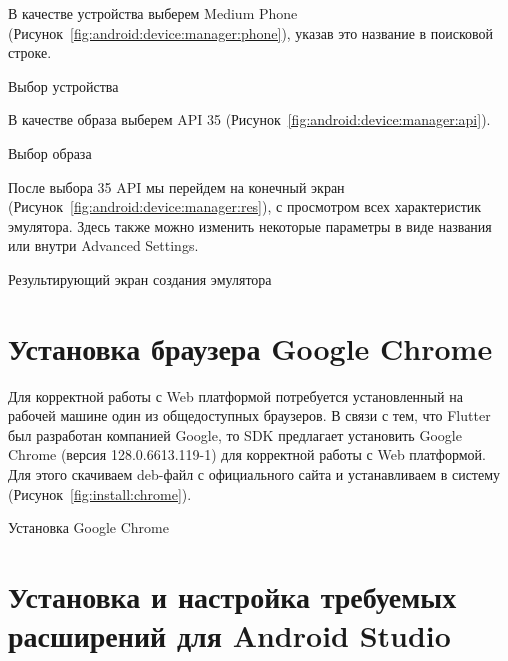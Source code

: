 В качестве устройства выберем Medium Phone
(Рисунок~\ref{fig:android:device:manager:phone}),
указав это название в поисковой строке.

\begin{image}
	\caption{Выбор устройства}
	\label{fig:android:device:manager:phone}
\end{image}

В качестве образа выберем API 35
(Рисунок~\ref{fig:android:device:manager:api}).

\begin{image}
	\caption{Выбор образа}
	\label{fig:android:device:manager:api}
\end{image}

После выбора 35 API мы перейдем на конечный экран
(Рисунок~\ref{fig:android:device:manager:res}),
с просмотром всех характеристик эмулятора.
Здесь также можно изменить некоторые параметры в виде названия
или внутри Advanced Settings.

\begin{image}
	\caption{Результирующий экран создания эмулятора}
	\label{fig:android:device:manager:res}
\end{image}

\section{Установка браузера Google Chrome}

Для корректной работы с Web платформой потребуется установленный
на рабочей машине один из общедоступных браузеров.
В связи с тем, что Flutter был разработан компанией Google,
то SDK предлагает установить Google Chrome (версия 128.0.6613.119-1)
для корректной работы с Web платформой.
Для этого скачиваем deb-файл с официального сайта
и устанавливаем в систему (Рисунок~\ref{fig:install:chrome}).

\begin{image}
	\caption{Установка Google Chrome}
	\label{fig:install:chrome}
\end{image}

\section{Установка и настройка требуемых расширений для Android Studio}

